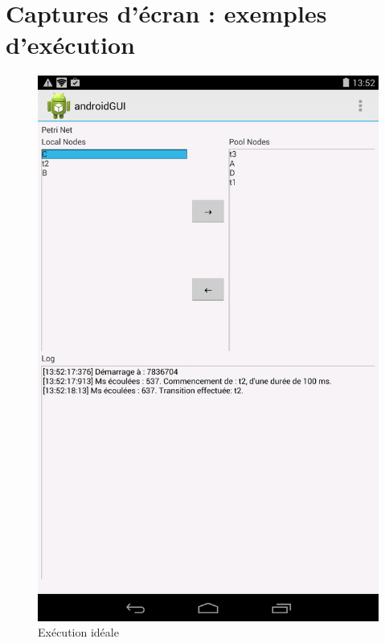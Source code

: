 	\chapter{Captures d'écran : exemples d'exécution}
	\begin{figure}
		\centering
		\includegraphics[scale=0.5]{images/resultats/client_simple_wifi.png}
		
		\caption{Exécution idéale}
		\label{fig.executionTheorique}
	\end{figure}
	
